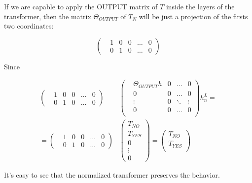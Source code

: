 If we are capable to apply the OUTPUT matrix of $T$ inside the layers of the transformer, then the matrix $\Theta_{OUTPUT}$ of $T_N$ will be just a projection of the firsts two coordinates:


\begin{equation*}
    \left(\begin{matrix}
        &1 &0 &0 &\dots &0 \\
        &0 &1 &0 &\dots &0 
    \end{matrix}\right)
\end{equation*}

Since

\begin{align*}
    \left(\begin{matrix}
        &1 &0 &0 &\dots &0 \\
        &0 &1 &0 &\dots &0 
    \end{matrix}\right)
    &\left(\begin{matrix}
        &\Theta_{OUTPUT}h &0 &\dots  &0 \\
        &0                &0 &\dots  &0 \\
        &\vdots           &0 &\ddots &\vdots \\
        &0                &0 &\dots  &0 \\
    \end{matrix}\right)h_n^L = \\
    = \left(\begin{matrix}
        &1 &0 &0 &\dots &0 \\
        &0 &1 &0 &\dots &0 
    \end{matrix}\right)
    &\left(\begin{matrix}
        T_{NO} \\
        T_{YES} \\ 
        0 \\
        \vdots \\
        0
    \end{matrix}\right) = 
    \left(\begin{matrix}
        T_{NO} \\
        T_{YES} \\ 
    \end{matrix}\right)
\end{align*}

It's easy to see that the normalized transformer preserves the behavior.
